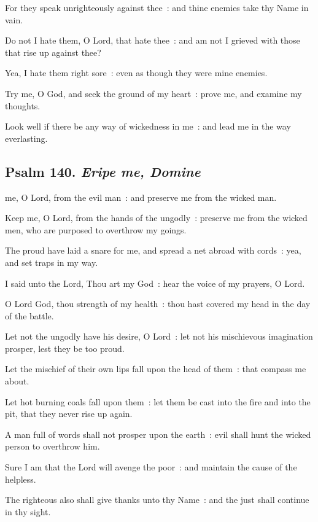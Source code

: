 For they speak unrighteously against thee~: and thine enemies take thy Name in vain.\par
{}Do not I hate them, O Lord, that hate thee~: and am not I grieved with those that rise up against thee?\par
{}Yea, I hate them right sore~: even as though they were mine enemies.\par
{}Try me, O God, and seek the ground of my heart~: prove me, and examine my thoughts.\par
{}Look well if there be any way of wickedness in me~: and lead me in the way everlasting.\par

\subsection{Psalm 140. \textit{Eripe me, Domine}}

 me, O Lord, from the evil man~: and preserve me from the wicked man.\par
{}
Keep me, O Lord, from the hands of the ungodly~: preserve me from the wicked men, who are purposed to overthrow my goings.\par
{}The proud have laid a snare for me, and spread a net abroad with cords~: yea, and set traps in my way.\par
{}I said unto the Lord, Thou art my God~: hear the voice of my prayers, O Lord.\par
{}O Lord God, thou strength of my health~: thou hast covered my head in the day of the battle.\par
{}Let not the ungodly have his desire, O Lord~: let not his mischievous imagination prosper, lest they be too proud.\par
{}Let the mischief of their own lips fall upon the head of them~: that compass me about.\par
{}Let hot burning coals fall upon them~: let them be cast into the fire and into the pit, that they never rise up again.\par
{}A man full of words shall not prosper upon the earth~: evil shall hunt the wicked person to overthrow him.\par
{}Sure I am that the Lord will avenge the poor~: and maintain the cause of the helpless.\par
{}The righteous also shall give thanks unto thy Name~: and the just shall continue in thy sight.\par



